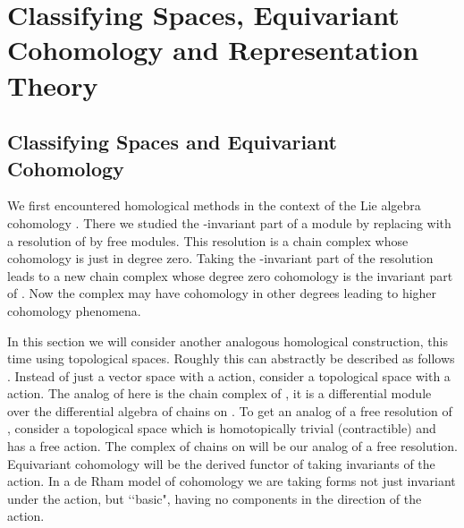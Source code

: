 \documentclass[a4paper,a4paper]{article}
\theoremstyle{conjecture}
\begin{document}
\section{Classifying Spaces, Equivariant Cohomology and Representation Theory}

\subsection{Classifying Spaces and Equivariant Cohomology}

We first encountered homological methods in the context of the Lie
algebra cohomology \coordHE{}.  There we studied the 
\coordHE{}-invariant part of a \coordHE{} module \coordHE{} by
replacing \coordHE{} with a resolution of \coordHE{} by free \coordHE{}   
modules.  This resolution is a chain complex whose cohomology is  
just \coordHE{} in degree zero.  Taking the \coordHE{}-invariant part
of the resolution leads to a new chain complex whose degree zero 
cohomology is the invariant part of \coordHE{}. Now the complex may have
cohomology in other degrees leading to higher cohomology
phenomena.

In this section we will consider another analogous homological construction,
this time using topological spaces.             
Roughly this can abstractly be described as follows \cite{Moore}.
Instead of just a
vector space \coordHE{} with a \coordHE{} action, consider a topological space
\coordHE{} with a \coordHE{} action. The analog of \coordHE{} here is the chain complex
of \coordHE{}, it is a differential module over the differential algebra  
\coordHE{} of chains on \coordHE{}. To get an analog of a free resolution
of \coordHE{}, consider a topological space \coordHE{} which is homotopically
trivial (contractible) and has a free \coordHE{} action.  The complex of 
chains on \coordHE{} will be our analog of a free resolution.
Equivariant cohomology will be the derived functor of taking
invariants of the \coordHE{} action.  In a de Rham model of cohomology we
are taking forms not just invariant under the \coordHE{} action, but \lq\lq basic",
having no components in the direction of the  \coordHE{} action.
\end{document}
